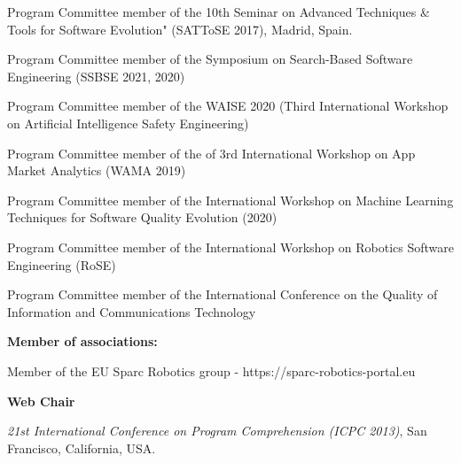 \documentclass[10pt]{article}
\begin{document}
\begin{innerlist}
\item Program Committee member of the 10th Seminar on Advanced Techniques \& Tools for Software Evolution" (SATToSE 2017), Madrid, Spain.\\
\item Program Committee member of the  Symposium on Search-Based Software Engineering (SSBSE 2021, 2020) 
\item Program Committee member of the  WAISE 2020 (Third International Workshop on Artificial Intelligence Safety Engineering)
\item Program Committee member of  the  of 3rd International Workshop on App Market Analytics (WAMA 2019)  
\item Program Committee member of the  International Workshop on Machine Learning Techniques for Software Quality Evolution (2020)
\item Program Committee member of  the  International Workshop on Robotics Software Engineering (RoSE) 
\item Program Committee member of  the International Conference on the
Quality of Information and Communications Technology 

\end{innerlist}

%
%

\textbf{Member of associations:}
\begin{innerlist}
\item Member of the EU Sparc Robotics group - https://sparc-robotics-portal.eu\\
\end{innerlist}

\textbf{Web Chair}
\begin{innerlist}
   \item \emph{21st International Conference on Program Comprehension (ICPC 2013)}, San Francisco, California, USA.\\
\end{innerlist}
\end{document}
